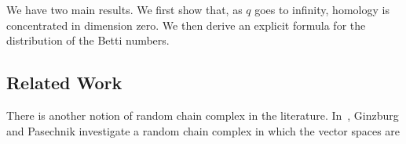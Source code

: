 We have two main results. We first show that, as $q$ goes to infinity, homology
is concentrated in dimension zero.  We then derive an explicit formula for the
distribution of the Betti numbers.


\subsection*{Related Work} There is another notion of random chain complex in the 
literature. In~\cite{ginzburg2017random}, Ginzburg and Pasechnik investigate
a random chain complex in which the vector spaces are 
